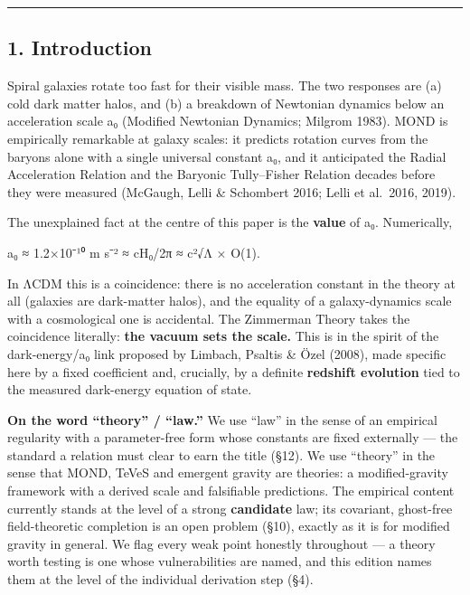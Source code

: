 \documentclass[
]{article}
\begin{document}
\begin{center}\rule{0.5\linewidth}{0.5pt}\end{center}

\subsection{1. Introduction}\label{introduction}

Spiral galaxies rotate too fast for their visible mass. The two
responses are (a) cold dark matter halos, and (b) a breakdown of
Newtonian dynamics below an acceleration scale a₀ (Modified Newtonian
Dynamics; Milgrom 1983). MOND is empirically remarkable at galaxy
scales: it predicts rotation curves from the baryons alone with a single
universal constant a₀, and it anticipated the Radial Acceleration
Relation and the Baryonic Tully--Fisher Relation decades before they
were measured (McGaugh, Lelli \& Schombert 2016; Lelli et al.~2016,
2019).

The unexplained fact at the centre of this paper is the \textbf{value}
of a₀. Numerically,

a₀ ≈ 1.2×10⁻¹⁰ m s⁻² ≈ cH₀/2π ≈ c²√Λ × O(1).

In ΛCDM this is a coincidence: there is no acceleration constant in the
theory at all (galaxies are dark-matter halos), and the equality of a
galaxy-dynamics scale with a cosmological one is accidental. The
Zimmerman Theory takes the coincidence literally: \textbf{the vacuum
sets the scale.} This is in the spirit of the dark-energy/a₀ link
proposed by Limbach, Psaltis \& Özel (2008), made specific here by a
fixed coefficient and, crucially, by a definite \textbf{redshift
evolution} tied to the measured dark-energy equation of state.

\textbf{On the word ``theory'' / ``law.''} We use ``law'' in the sense
of an empirical regularity with a parameter-free form whose constants
are fixed externally --- the standard a relation must clear to earn the
title (§12). We use ``theory'' in the sense that MOND, TeVeS and
emergent gravity are theories: a modified-gravity framework with a
derived scale and falsifiable predictions. The empirical content
currently stands at the level of a strong \textbf{candidate} law; its
covariant, ghost-free field-theoretic completion is an open problem
(§10), exactly as it is for modified gravity in general. We flag every
weak point honestly throughout --- a theory worth testing is one whose
vulnerabilities are named, and this edition names them at the level of
the individual derivation step (§4).
\end{document}
